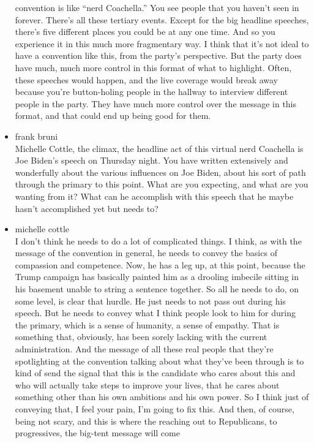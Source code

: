 \begin{itemize}
  convention is like ``nerd Coachella.'' You see people that you haven't
  seen in forever. There's all these tertiary events. Except for the big
  headline speeches, there's five different places you could be at any
  one time. And so you experience it in this much more fragmentary way.
  I think that it's not ideal to have a convention like this, from the
  party's perspective. But the party does have much, much more control
  in this format of what to highlight. Often, these speeches would
  happen, and the live coverage would break away because you're
  button-holing people in the hallway to interview different people in
  the party. They have much more control over the message in this
  format, and that could end up being good for them.
\item
  frank bruni\\
  Michelle Cottle, the climax, the headline act of this virtual nerd
  Coachella is Joe Biden's speech on Thursday night. You have written
  extensively and wonderfully about the various influences on Joe Biden,
  about his sort of path through the primary to this point. What are you
  expecting, and what are you wanting from it? What can he accomplish
  with this speech that he maybe hasn't accomplished yet but needs to?
\item
  michelle cottle\\
  I don't think he needs to do a lot of complicated things. I think, as
  with the message of the convention in general, he needs to convey the
  basics of compassion and competence. Now, he has a leg up, at this
  point, because the Trump campaign has basically painted him as a
  drooling imbecile sitting in his basement unable to string a sentence
  together. So all he needs to do, on some level, is clear that hurdle.
  He just needs to not pass out during his speech. But he needs to
  convey what I think people look to him for during the primary, which
  is a sense of humanity, a sense of empathy. That is something that,
  obviously, has been sorely lacking with the current administration.
  And the message of all these real people that they're spotlighting at
  the convention talking about what they've been through is to kind of
  send the signal that this is the candidate who cares about this and
  who will actually take steps to improve your lives, that he cares
  about something other than his own ambitions and his own power. So I
  think just of conveying that, I feel your pain, I'm going to fix this.
  And then, of course, being not scary, and this is where the reaching
  out to Republicans, to progressives, the big-tent message will come

\end{itemize}
